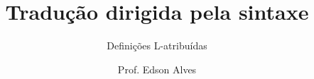 \title{Tradução dirigida pela sintaxe}
\subtitle{Definições L-atribuídas}
\date{}
\author{Prof. Edson Alves}
